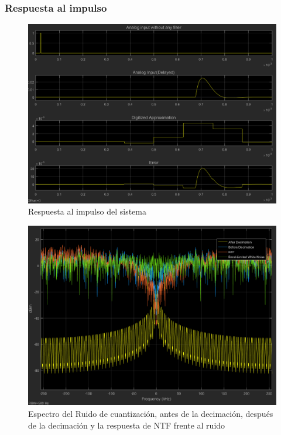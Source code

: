 \documentclass[assd_tp3_main.tex]{subfiles}
\begin{document}
\subsubsection{Respuesta al impulso}
\begin{figure}[H]
\centering
\includegraphics[width=1\linewidth]{images/ej4/impulse_response.png}
\caption{Respuesta al impulso del sistema}
\label{fig:impulse_response}
\end{figure}

\begin{figure}[H]
\centering
\includegraphics[width=1\linewidth]{images/ej4/NTF.png}
\caption{Espectro del Ruido de cuantización, antes de la decimación, después de la decimación y la respuesta de NTF frente al ruido}
\label{fig:NTF}
\end{figure}
\end{document}

